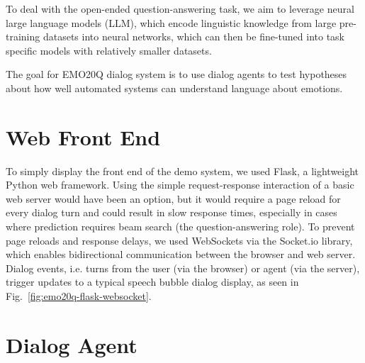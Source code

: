 \documentclass[conference]{IEEEtran}
\begin{document}
To deal with the open-ended question-answering task, we aim to
leverage neural large language models (LLM), which encode linguistic
knowledge from large pre-training datasets into neural networks,
which can then be fine-tuned into task specific models with relatively
smaller datasets.  %


The goal for EMO20Q dialog system is to use dialog agents to test
hypotheses about how well automated systems can understand language
about emotions.




\section{Web Front End}

To simply display the front end of the demo system, we used Flask, a
lightweight Python web framework.  Using the simple request-response
interaction of a basic web server would have been an option, but it
would require a page reload for every dialog turn and could result in
slow response times, especially in cases where prediction requires
beam search (the question-answering role).  To prevent page reloads
and response delays, we used WebSockets via the Socket.io library,
which enables bidirectional communication between the browser and
web server.  Dialog events, i.e. turns from the user (via the browser)
or agent (via the server), trigger updates to a typical speech bubble
dialog display, as seen in Fig.~\ref{fig:emo20q-flask-websocket}.

\section{Dialog Agent}
\end{document}

